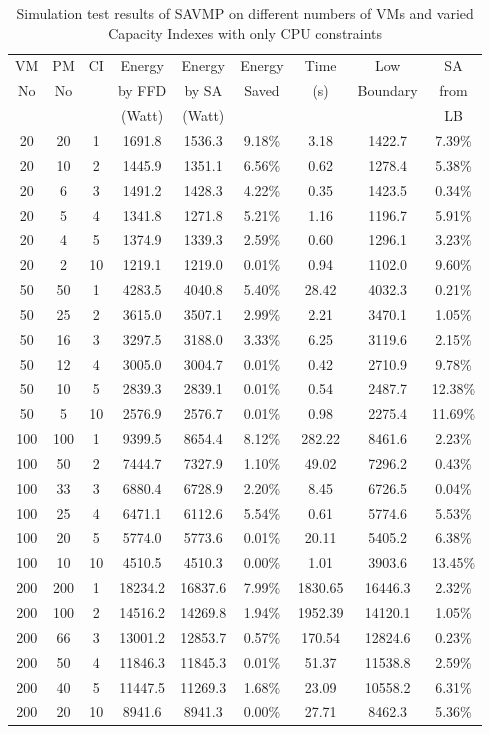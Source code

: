 \documentclass[10pt, conference, compsocconf]{IEEEtran}
\begin{document}
\begin{table*}[t]
\begin{center}
\caption{
Simulation test results of SAVMP on different numbers of VMs and
varied Capacity Indexes with only CPU constraints
}
\begin{tabular}
{c|c|c|c|c|c|c|c|c}
VM  & PM & CI & Energy  & Energy   & Energy & Time  & Low & SA\\
No & No & & by FFD & by SA &  Saved & (s) & Boundary & from\\
  & & & (Watt) & (Watt) & & &  & LB\\
\hline 
20 & 20 & 1 & 1691.8 & 1536.3 & 9.18\% & 3.18 & 1422.7 & 7.39\%\\
20 & 10 & 2 & 1445.9 & 1351.1 & 6.56\% & 0.62 & 1278.4 & 5.38\%\\
20 & 6  & 3 & 1491.2 & 1428.3 & 4.22\% & 0.35 & 1423.5 & 0.34\%\\
20 & 5  & 4 & 1341.8 & 1271.8 & 5.21\% & 1.16 & 1196.7 & 5.91\%\\
20 & 4  & 5 & 1374.9 & 1339.3 & 2.59\% & 0.60 & 1296.1 & 3.23\%\\
20 & 2  &10 & 1219.1 & 1219.0 & 0.01\% & 0.94 & 1102.0 & 9.60\%\\
\hline
50 & 50 &1 & 4283.5 & 4040.8 & 5.40\% & 28.42 & 4032.3 & 0.21\%\\
50 & 25 &2 & 3615.0 & 3507.1 & 2.99\% & 2.21 & 3470.1 & 1.05\%\\
50 & 16 &3 & 3297.5 & 3188.0 & 3.33\% & 6.25 & 3119.6 & 2.15\%\\
50 & 12 &4 & 3005.0 & 3004.7 & 0.01\% & 0.42 & 2710.9 & 9.78\%\\
50 & 10 &5 & 2839.3 & 2839.1 & 0.01\% & 0.54 & 2487.7 & 12.38\%\\
50 & 5  &10 & 2576.9 & 2576.7 & 0.01\% & 0.98 & 2275.4 & 11.69\%\\
\hline
100 &100 & 1 & 9399.5 & 8654.4 & 8.12\% & 282.22 & 8461.6 & 2.23\%\\
100 &50  & 2 & 7444.7 & 7327.9 & 1.10\% & 49.02 & 7296.2 & 0.43\%\\
100 &33  & 3 & 6880.4 & 6728.9 & 2.20\% & 8.45 & 6726.5 & 0.04\%\\
100 &25  & 4 & 6471.1 & 6112.6 & 5.54\% & 0.61 & 5774.6 & 5.53\%\\
100 &20  & 5 & 5774.0 & 5773.6 & 0.01\% & 20.11 & 5405.2 & 6.38\%\\
100 &10  & 10 & 4510.5 & 4510.3 & 0.00\% & 1.01 & 3903.6 & 13.45\%\\
\hline
200 &200 & 1 & 18234.2 & 16837.6 & 7.99\% & 1830.65 & 16446.3 & 2.32\%\\
200 &100 & 2 & 14516.2 & 14269.8 & 1.94\% & 1952.39 & 14120.1 & 1.05\%\\
200 &66  & 3 & 13001.2 & 12853.7 & 0.57\% & 170.54 & 12824.6 & 0.23\%\\
200 &50  & 4 & 11846.3 & 11845.3 & 0.01\% & 51.37 & 11538.8 & 2.59\%\\
200 &40  & 5 & 11447.5 & 11269.3 & 1.68\% & 23.09 & 10558.2 & 6.31\%\\
200 &20  & 10 & 8941.6 & 8941.3 & 0.00\% & 27.71 & 8462.3 & 5.36\%
\end{tabular}
\end{center}
\end{table*}
\end{document}
